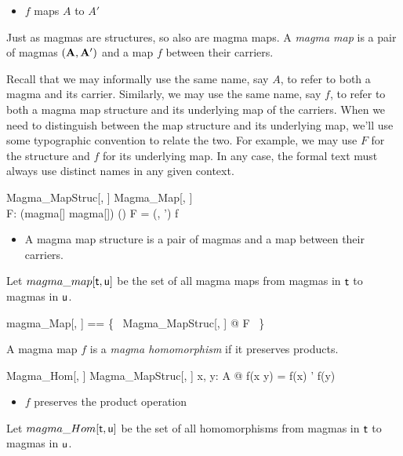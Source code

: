 \documentclass{amsart}
\begin{document}
\begin{itemize}
	\item $f$ maps $A$ to $A'$
\end{itemize}

Just as magmas are structures, so also are magma maps.
A \textit{magma map} is a pair of magmas $(\mathbf{A}, \mathbf{A}')$
and a map $f$ between their carriers.

Recall that we may informally use the same name, say $A$, to refer to both a magma and its carrier.
Similarly, we may use the same name, say $f$, to refer to both a magma map structure and its
underlying map of the carriers.
When we need to distinguish between the map structure and its underlying map,
we'll use some typographic convention to relate the two.
For example, we may use $F$ for the structure and $f$ for its underlying map.
In any case, the formal text must always use distinct names in any given context.

\begin{schema}{Magma\_MapStruc}[\genT, \genU]
	Magma\_Map[\genT, \genU] \\
	F: (magma[\genT] \cross magma[\genU]) \cross (\genT \pfun \genU)
\where
	F = (\strucA, \strucA') \mapsto f
\end{schema}

\begin{itemize}
	\item A magma map structure is a pair of magmas and a map between their carriers.
\end{itemize}


Let $magma\_map[\mathsf{t}, \mathsf{u}]$ be the set of all magma maps
from magmas in $\mathsf{t}$ to magmas in $\mathsf{u}$.

\begin{zed}
	magma\_Map[\genT, \genU] == \{~ Magma\_MapStruc[\genT, \genU] @ F ~\}
\end{zed}

A magma map $f$ is a \textit{magma homomorphism} if it preserves products.

\begin{schema}{Magma\_Hom}[\genT, \genU]
	Magma\_MapStruc[\genT, \genU]
\where
	\forall x, y: A @ f(x \opG y) = f(x) \opG' f(y)
\end{schema}

\begin{itemize}
	\item $f$ preserves the product operation
\end{itemize}

Let $magma\_Hom[\mathsf{t}, \mathsf{u}]$ be the set of all homomorphisms
from magmas in $\mathsf{t}$ to magmas in $\mathsf{u}$.
\end{document}
